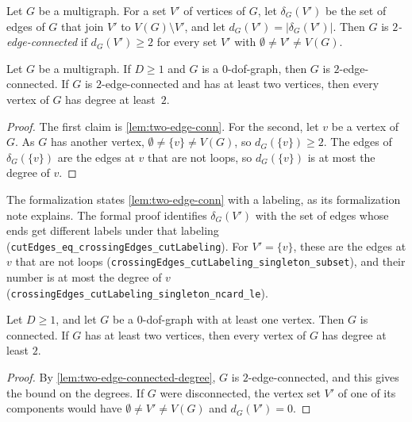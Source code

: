 \begin{definition}
  \label{def:cut-edges-2ec}
  \leanok
  Let $G$ be a multigraph. For a set $V'$ of vertices of $G$, let
  $\delta_G(V')$ be the set of edges of $G$ that join $V'$ to
  $V(G) \setminus V'$, and let $d_G(V') = |\delta_G(V')|$. Then $G$ is
  \emph{$2$-edge-connected} if $d_G(V') \ge 2$ for every set $V'$ with
  $\emptyset \neq V' \neq V(G)$.
\end{definition}

\begin{lemma}
  \label{lem:two-edge-connected-degree}
  \leanok
  Let $G$ be a multigraph. If $D \ge 1$ and $G$ is a $0$-dof-graph,
  then $G$ is $2$-edge-connected. If $G$ is $2$-edge-connected and has
  at least two vertices, then every vertex of $G$ has degree at
  least~$2$.
\end{lemma}
\begin{proof}
  \leanok
  The first claim is \cref{lem:two-edge-conn}. For the second, let $v$
  be a vertex of $G$. As $G$ has another vertex,
  $\emptyset \neq \{v\} \neq V(G)$, so $d_G(\{v\}) \ge 2$. The edges of
  $\delta_G(\{v\})$ are the edges at $v$ that are not loops, so
  $d_G(\{v\})$ is at most the degree of $v$.
\end{proof}
\begin{fmlnote}
  The formalization states \cref{lem:two-edge-conn} with a labeling, as
  its formalization note explains. The formal proof identifies
  $\delta_G(V')$ with the set of edges whose ends get different labels
  under that labeling
  (\texttt{cutEdges\_\allowbreak{}eq\_\allowbreak{}crossingEdges\_\allowbreak{}cutLabeling}).
  For $V' = \{v\}$, these are the edges at $v$ that are not loops
  (\texttt{crossingEdges\_\allowbreak{}cutLabeling\_\allowbreak{}singleton\_\allowbreak{}subset}),
  and their number is at most the degree of $v$
  (\texttt{crossingEdges\_\allowbreak{}cutLabeling\_\allowbreak{}singleton\_\allowbreak{}ncard\_\allowbreak{}le}).
\end{fmlnote}

\begin{lemma}
  \label{lem:deficiency-zero-connected}
  \leanok
  Let $D \ge 1$, and let $G$ be a $0$-dof-graph with at least one
  vertex. Then $G$ is connected. If $G$ has at least two vertices, then
  every vertex of $G$ has degree at least $2$.
\end{lemma}
\begin{proof}
  \leanok
  By \cref{lem:two-edge-connected-degree}, $G$ is $2$-edge-connected,
  and this gives the bound on the degrees. If $G$ were disconnected,
  the vertex set $V'$ of one of its components would have
  $\emptyset \neq V' \neq V(G)$ and $d_G(V') = 0$.
\end{proof}

